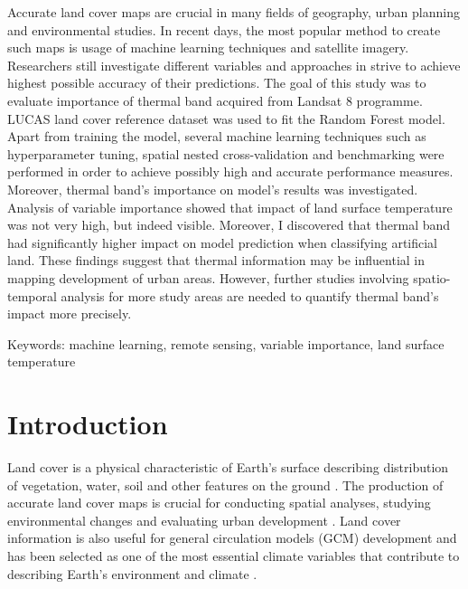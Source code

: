 \documentclass{amuthesis}
\begin{document}
Accurate land cover maps are crucial in many fields of geography, urban
planning and environmental studies. In recent days, the most popular
method to create such maps is usage of machine learning techniques and
satellite imagery. Researchers still investigate different variables and
approaches in strive to achieve highest possible accuracy of their
predictions. The goal of this study was to evaluate importance of
thermal band acquired from Landsat 8 programme. LUCAS land cover
reference dataset was used to fit the Random Forest model. Apart from
training the model, several machine learning techniques such as
hyperparameter tuning, spatial nested cross-validation and benchmarking
were performed in order to achieve possibly high and accurate
performance measures. Moreover, thermal band's importance on model's
results was investigated. Analysis of variable importance showed that
impact of land surface temperature was not very high, but indeed
visible. Moreover, I discovered that thermal band had significantly
higher impact on model prediction when classifying artificial land.
These findings suggest that thermal information may be influential in
mapping development of urban areas. However, further studies involving
spatio-temporal analysis for more study areas are needed to quantify
thermal band's impact more precisely.

Keywords: machine learning, remote sensing, variable importance, land
surface temperature

\newpage

\sf\tighttoc\doublespacing


\hypertarget{sec-intro}{%
\chapter{Introduction}\label{sec-intro}}

Land cover is a physical characteristic of Earth's surface describing
distribution of vegetation, water, soil and other features on the ground
\autocite{rawat_monitoring_2015}. The production of accurate land cover
maps is crucial for conducting spatial analyses, studying environmental
changes \autocite{reis_analyzing_2008} and evaluating urban development
\autocite{hashem_change_2015}. Land cover information is also useful for
general circulation models (GCM) development
\autocite{running_ecosystem_2008} and has been selected as one of the
most essential climate variables that contribute to describing Earth's
environment and climate \autocite{bojinski_concept_2014}.
\end{document}
